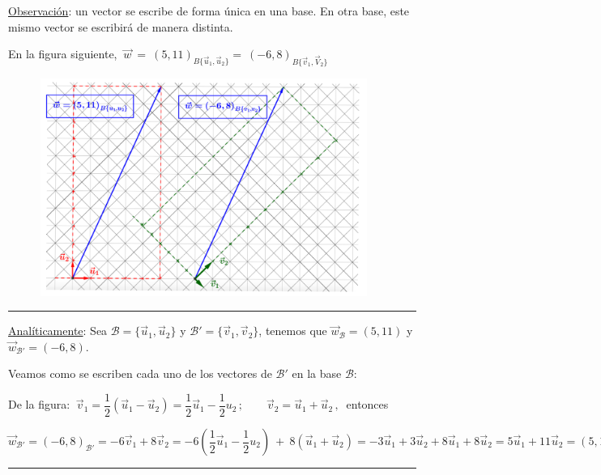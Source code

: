 \vspace{5mm}

\underline{Observación}: un vector se escribe de forma única en una base. En otra base, este mismo vector se escribirá de manera distinta.

En la figura siguiente,  $\ \vec w \ = \ (5,11)_{B\{\vec u_1,\vec u_2\}} = \ (-6,8)_{B\{\vec v_1,\vec V_2\}}$


\begin{figure}[H]
	\centering
	\includegraphics[width=0.95\textwidth]{img-vec/vec07.png}	
\end{figure}


\color{gris}
\rule{300pt}{0.1pt}

\underline{Analíticamente}: Sea $\mathcal B=\{\vec u_1,\vec u_2\}$ y $\mathcal B'=\{\vec v_1,\vec v_2\}$, tenemos que $\vec w_{\mathcal B}=(5,11)$ y $\vec w_{\mathcal B'}=(-6,8)$.

Veamos como se escriben cada uno de los vectores de $\mathcal B'$ en la base $\mathcal B$:

De la figura: $\ \vec v_1=\dfrac 1 2 (\vec u_1-\vec u_2)=\dfrac 1 2 \vec u_1-\dfrac 1 2u_2\, ; \qquad \vec v_2=\vec u_1+\vec u_2\, , \ $ entonces

$\vec w_{\mathcal B'}=(-6,8)_{\mathcal B'}=-6\vec v_1+8\vec v_2= -6 \left( \dfrac 1 2 \vec u_1-\dfrac 1 2u_2 \right) \ + \ 8 (\vec u_1+\vec u_2)=-3\vec u_1+3\vec u_2+8\vec u_1+8\vec u_2=5\vec u_1+11\vec u_2=(5,11)_{\mathcal B}=\vec w_{\mathcal B}$

\vspace{-7mm} \begin{flushright} \rule{300pt}{0.1pt} \end{flushright}
 
\color{black}

